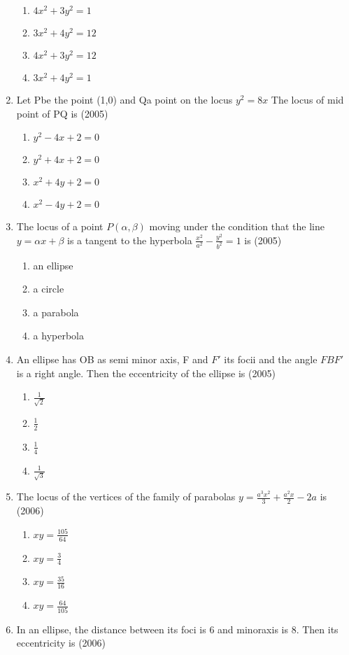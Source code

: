 \documentclass[12pt]{article}
\begin{document}
\begin{enumerate}
\begin{enumerate}
\item $4x^2+3y^2=1$
\item $3x^2+4y^2=12$
\item $4x^2+3y^2=12$
\item $3x^2+4y^2=1$
\end{enumerate}
\item Let Pbe the point (1,0) and Qa point on the locus $y^2=8x$ The locus of mid point of PQ is (2005)
\begin{enumerate}
\item $y^2-4x+2=0$
\item $y^2+4x+2=0$
\item $x^2+4y+2=0$
\item $x^2-4y+2=0$
\end{enumerate}
\item The locus of a point $P(\alpha,\beta)$ moving under the condition that the line $y=\alpha x+\beta$ is a tangent to the hyperbola $\frac{x^2}{a^2}-\frac{y^2}{b^2}=1$ is  (2005)
\begin{enumerate}
\item an ellipse
\item a circle
\item a parabola
\item a hyperbola
\end{enumerate}
\item An ellipse has OB as semi minor axis, F and $F'$ its focii and the angle $FBF'$ is a right angle. Then the eccentricity of the ellipse is (2005)
\begin{enumerate}
\item $\frac{1}{\sqrt{2}}$
\item $\frac{1}{2}$
\item $\frac{1}{4}$
\item $\frac{1}{\sqrt{3}}$
\end{enumerate}
\item The locus of the vertices of the family of parabolas $y=\frac{a^3x^2}{3}+\frac{a^2x}{2}-2a$ is (2006)
\begin{enumerate}
\item $xy=\frac{105}{64}$
\item $xy=\frac{3}{4}$
\item $xy=\frac{35}{16}$
\item $xy=\frac{64}{105}$
\end{enumerate}
\item In an ellipse, the distance between its foci is 6 and minoraxis is 8. Then its eccentricity is (2006)

\end{enumerate}
\end{document}
